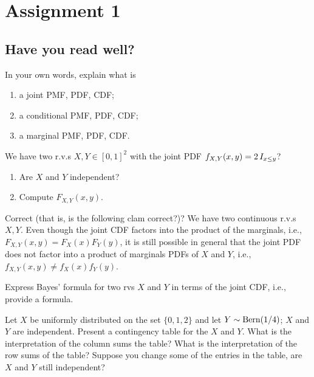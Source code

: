 \documentclass[assignments]{subfiles}
\begin{document}
\section{Assignment 1}
\label{sec:org9cbca82}


\subsection{Have you read well?}
\label{sec:have-you-read}


\begin{exercise}
In your own words, explain what is
\begin{enumerate}
\item a joint PMF, PDF, CDF;
\item a conditional PMF, PDF, CDF;
\item a marginal PMF, PDF, CDF.
\end{enumerate}
\end{exercise}

\begin{exercise}
We have two r.v.s $X, Y \in [0,1]^{2}$ with the joint PDF $f_{X,Y}(x,y) = 2 \,I_{x\leq y}$? 
\begin{enumerate}
\item Are $X$ and $Y$ independent? 
\item Compute $F_{X,Y}(x,y)$. 
\end{enumerate}
\end{exercise}

\begin{exercise}
Correct (that is, is the following clam correct?)?
We have two continuous r.v.s $X, Y$.
Even though the joint CDF factors into the product of the marginals, i.e., $F_{X,Y}(x,y) = F_X(x)F_Y(y)$, it is still possible in general that the joint PDF does not factor into a product of marginals PDFs of $X$ and $Y$, i.e., $f_{X,Y}(x,y) \neq f_X(x) f_Y(y)$.
\end{exercise}

\begin{exercise}
Express Bayes' formula for two rvs $X$ and $Y$ in terms of the joint CDF, i.e., provide a formula.
\end{exercise}

\begin{exercise}
Let $X$ be uniformly distributed on the set $\{0,1,2\}$ and let $Y \sim \mathrm{Bern}(1/4)$; $X$ and $Y$ are independent.
Present a contingency table for the $X$ and $Y$.
What is the interpretation of the column sums the table?
What is the interpretation of the row sums of the table? Suppose you change some of the entries in the table, are $X$ and $Y$ still independent?
\end{exercise}
\end{document}
